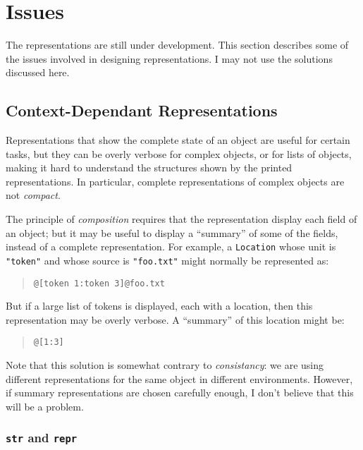 \documentclass[11pt]{article}
\begin{document}
\section{Issues}

The representations are still under development.  This section
describes some of the issues involved in designing representations.  I
may not use the solutions discussed here.

\subsection{Context-Dependant Representations}

  Representations that show the complete state of an object are useful
  for certain tasks, but they can be overly verbose for complex
  objects, or for lists of objects, making it hard to understand the
  structures shown by the printed representations.  In particular,
  complete representations of complex objects are not \emph{compact}.

  The principle of \emph{composition} requires that the representation
  display each field of an object; but it may be useful to display a
  ``summary'' of some of the fields, instead of a complete
  representation.  For example, a \texttt{Location} whose unit is
  \texttt{"token"} and whose source is \texttt{"foo.txt"} might
  normally be represented as:

  \begin{quote}
    \texttt{@[token 1:token 3]@foo.txt}
  \end{quote}

  But if a large list of tokens is displayed, each with a location,
  then this representation may be overly verbose.  A ``summary'' of
  this location might be:

  \begin{quote}
    \texttt{@[1:3]}
  \end{quote}

  Note that this solution is somewhat contrary to \emph{consistancy}:
  we are using different representations for the same object in
  different environments.  However, if summary representations are
  chosen carefully enough, I don't believe that this will be a
  problem.

\subsubsection{\texttt{str} and \texttt{repr}}
\end{document}
